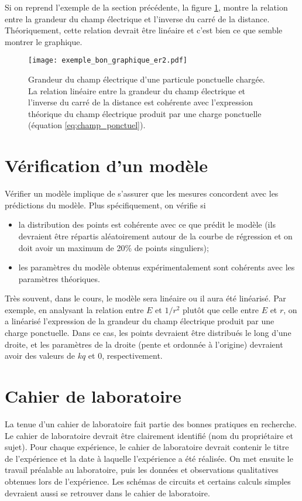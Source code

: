 \documentclass[letterpaper, DIV=11]{scrartcl}
\begin{document}
Si on reprend l'exemple de la section précédente, la figure \ref{fig:bon_er2},
montre la relation entre la grandeur du champ électrique et l'inverse du carré
de la distance. Théoriquement, cette relation devrait être linéaire et c'est
bien ce que semble montrer le graphique.

\begin{figure}
  \centering
  \texttt{[image: exemple\_bon\_graphique\_er2.pdf]}
  \caption{Grandeur du champ électrique d'une particule ponctuelle chargée. La
  relation linéaire entre la grandeur du champ électrique et l'inverse du carré
  de la distance est cohérente avec l'expression théorique du champ électrique
  produit par une charge ponctuelle (équation \ref{eq:champ_ponctuel}).}
  \label{fig:bon_er2}
\end{figure}


\section*{Vérification d'un modèle}

Vérifier un modèle implique de s'assurer que les mesures concordent avec les
prédictions du modèle. Plus spécifiquement, on vérifie si
\begin{itemize}
  \item la distribution des points est cohérente avec ce que prédit le
    modèle (ils devraient être répartis aléatoirement autour de la courbe de
    régression et on doit avoir un maximum de 20\% de points singuliers);
  \item les paramètres du modèle obtenus expérimentalement sont cohérents
    avec les paramètres théoriques.
\end{itemize}
Très souvent, dans le cours, le modèle sera linéaire ou il aura été linéarisé.
Par exemple, en analysant la relation entre $E$ et $1/r^2$ plutôt que celle
entre $E$ et $r$, on a linéarisé l'expression de la grandeur du champ électrique
produit par une charge ponctuelle. Dans ce cas, les points devraient être
distribués le long d'une droite, et les paramètres de la droite (pente et
ordonnée à l'origine) devraient avoir des valeurs de $kq$ et 0, respectivement.

\section*{Cahier de laboratoire}

La tenue d'un cahier de laboratoire fait partie des bonnes pratiques en
recherche. Le cahier de laboratoire devrait être clairement identifié (nom du
propriétaire et sujet). Pour chaque expérience, le cahier de laboratoire devrait
contenir le titre de l'expérience et la date à laquelle l'expérience a été
réalisée. On met ensuite le travail préalable au laboratoire, puis les données
et observations qualitatives obtenues lors de l'expérience. Les schémas de
circuits et certains calculs simples devraient aussi se retrouver dans le
cahier de laboratoire.


\printbibliography
\end{document}
